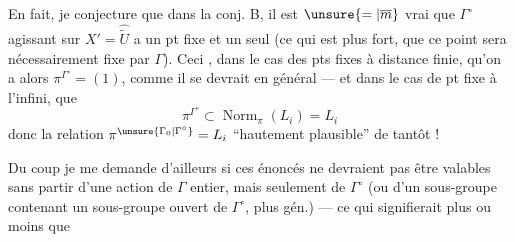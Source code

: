 En fait, je conjecture que dans la conj. B, il est $\unsure{=|\overline m}$ vrai que $\Gamma^\circ$ agissant sur $X'=\widehat{\widetilde U}$ a un pt fixe et un seul (ce qui est plus fort, que ce point  sera nécessairement fixe par $\Gamma$). Ceci , dans le cas des pts fixes à distance finie, qu'on a alors $\pi^{\Gamma^\circ}=(1)$, comme il se devrait en général --- et dans le cas de pt fixe à l'infini, que
\[
\pi^{\Gamma^\circ}\subset\operatorname{Norm}_{\pi}(L_i)=L_i
\]
donc la relation $\pi^{\unsure{\Gamma_0|\Gamma^\circ}}=L_i$ ``hautement plausible'' de tantôt !

Du coup je me demande d'ailleurs si ces énoncés ne devraient pas être valables sans partir d'une action de $\Gamma$  entier, mais seulement de $\Gamma^\circ$ (ou d'un sous-groupe contenant un sous-groupe ouvert de $\Gamma^\circ$, plus gén.) --- ce qui signifierait plus ou moins que
